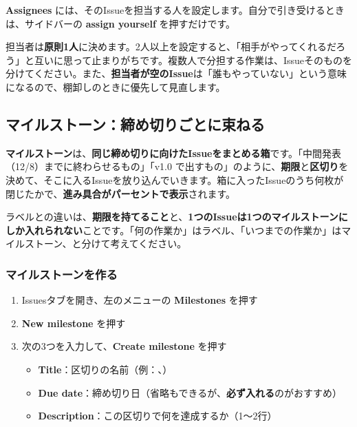 \textbf{Assignees} には、そのIssueを担当する人を設定します。自分で引き受けるときは、サイドバーの \textbf{assign yourself} を押すだけです。

担当者は\textbf{原則1人}に決めます。2人以上を設定すると、「相手がやってくれるだろう」と互いに思って止まりがちです。複数人で分担する作業は、Issueそのものを分けてください。また、\textbf{担当者が空のIssue}は「誰もやっていない」という意味になるので、棚卸しのときに優先して見直します。

\subsection{マイルストーン：締め切りごとに束ねる}

\textbf{マイルストーン}は、\textbf{同じ締め切りに向けたIssueをまとめる箱}です。「中間発表（12/8）までに終わらせるもの」「v1.0 で出すもの」のように、\textbf{期限}と\textbf{区切り}を決めて、そこに入るIssueを放り込んでいきます。箱に入ったIssueのうち何枚が閉じたかで、\textbf{進み具合がパーセントで表示}されます。

ラベルとの違いは、\textbf{期限を持てること}と、\textbf{1つのIssueは1つのマイルストーンにしか入れられない}ことです。「何の作業か」はラベル、「いつまでの作業か」はマイルストーン、と分けて考えてください。

\subsubsection{マイルストーンを作る}

\begin{enumerate}[leftmargin=1.6em]
  \item Issuesタブを開き、左のメニューの \textbf{Milestones} を押す
  \item \textbf{New milestone} を押す
  \item 次の3つを入力して、\textbf{Create milestone} を押す
  \begin{itemize}[leftmargin=1.4em, nosep]
    \item \textbf{Title}：区切りの名前（例：、）
    \item \textbf{Due date}：締め切り日（省略もできるが、\textbf{必ず入れる}のがおすすめ）
    \item \textbf{Description}：この区切りで何を達成するか（1〜2行）
  \end{itemize}
\end{enumerate}

